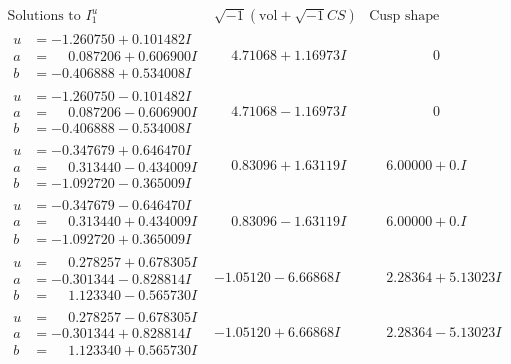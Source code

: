 \documentclass[1p]{elsarticle_modified}
\theoremstyle{definition}
\newcommand{\I}{\sqrt{-1}}
\begin{document}
$$\begin{array}{c|c|c}
\text{Solutions to }I^u_{1}& \I (\text{vol} + \sqrt{-1}CS) & \text{Cusp shape}\\
 \hline 
\begin{aligned}
u &= -1.260750 + 0.101482 I \\
a &= \phantom{-}0.087206 + 0.606900 I \\
b &= -0.406888 + 0.534008 I\end{aligned}
 & \phantom{-}4.71068 + 1.16973 I & \phantom{-0.000000 } 0 \\ \hline\begin{aligned}
u &= -1.260750 - 0.101482 I \\
a &= \phantom{-}0.087206 - 0.606900 I \\
b &= -0.406888 - 0.534008 I\end{aligned}
 & \phantom{-}4.71068 - 1.16973 I & \phantom{-0.000000 } 0 \\ \hline\begin{aligned}
u &= -0.347679 + 0.646470 I \\
a &= \phantom{-}0.313440 - 0.434009 I \\
b &= -1.092720 - 0.365009 I\end{aligned}
 & \phantom{-}0.83096 + 1.63119 I & \phantom{-}6.00000 + 0. I\phantom{ +0.000000I} \\ \hline\begin{aligned}
u &= -0.347679 - 0.646470 I \\
a &= \phantom{-}0.313440 + 0.434009 I \\
b &= -1.092720 + 0.365009 I\end{aligned}
 & \phantom{-}0.83096 - 1.63119 I & \phantom{-}6.00000 + 0. I\phantom{ +0.000000I} \\ \hline\begin{aligned}
u &= \phantom{-}0.278257 + 0.678305 I \\
a &= -0.301344 - 0.828814 I \\
b &= \phantom{-}1.123340 - 0.565730 I\end{aligned}
 & -1.05120 - 6.66868 I & \phantom{-}2.28364 + 5.13023 I \\ \hline\begin{aligned}
u &= \phantom{-}0.278257 - 0.678305 I \\
a &= -0.301344 + 0.828814 I \\
b &= \phantom{-}1.123340 + 0.565730 I\end{aligned}
 & -1.05120 + 6.66868 I & \phantom{-}2.28364 - 5.13023 I \\ \hline\begin{aligned}

\end{aligned}
\end{array}$$
\end{document}
